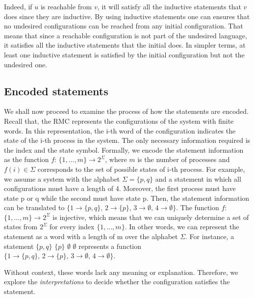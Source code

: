Indeed, if $u$ is reachable from $v$, it will satisfy all the inductive statements that $v$ does since they are inductive. 
By using inductive statements one can ensures that no undesired configurations can be reached from any initial configuration. 
That means that since a reachable configuration is not part of the undesired language, it satisfies all the inductive statements that the initial does. 
In simpler terms, at least one inductive statement is satisfied by the initial configuration but not the undesired one.

\subsection*{Encoded statements}
We shall now proceed to examine the process of how the statements are encoded.
Recall that, the RMC represents the configurations of the system with finite words. 
In this representation, the i-th word of the configuration indicates the state of the i-th process in the system. 
The only necessary information required is the index and the state symbol.
Formally, we encode the statement information as the function $f$: $\{1,\dots,m\} \rightarrow 2^\Sigma$, 
where $m$ is the number of processes and $f(i) \in \Sigma$ corresponds to the set of possible states of i-th process.
For example, we assume a system with the alphabet $\Sigma = \{p,q\}$ and a statement in which all configurations must have a length of 4.
Moreover, the first process must have state p or q while the second must have state p.
Then, the statement information can be translated to $\{1 \rightarrow \{p, q\}, \, 2 \rightarrow \{p\}, \, 3 \rightarrow \emptyset,\, 4 \rightarrow \emptyset\}$.
The function $f$: $\{1,\dots,m\} \rightarrow 2^\Sigma$ is injective, which means
that we can uniquely determine a set of states from $2^\Sigma$ for every index $\{1,\dots,m\}$.
In other words, we can represent the statement as a word with a length of m over the alphabet $\Sigma$.
For instance, a statement $\{p, q\} \,\, \{p\} \,\, \emptyset \,\,\emptyset$ represents a function $\{1 \rightarrow \{p, q\}, \, 2 \rightarrow \{p\}, \, 3 \rightarrow \emptyset,\, 4 \rightarrow \emptyset\}$.

Without context, these words lack any meaning or explanation.
Therefore, we explore the \textit{interpretations} to decide whether the configuration satisfies the statement.

